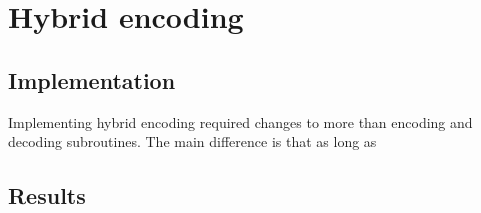 \section{Hybrid encoding}

\subsection{Implementation}

Implementing hybrid encoding required changes to more than encoding and decoding
subroutines. The main difference is that as long as 

\subsection{Results}
